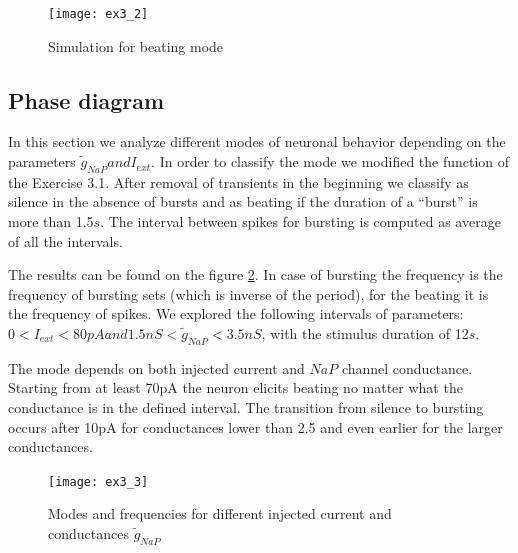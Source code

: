 \documentclass[a4paper,11pt]{article} %
\begin{document}
\begin{figure}[H]
    \centering
    \texttt{[image: ex3\_2]}
    \caption{Simulation for beating mode}
    \label{fig:beat}
\end{figure}


\subsection{Phase diagram}

In this section we analyze different modes of neuronal behavior
depending on the parameters  $\tilde{g}_{NaP} and I_{ext}$.
In order to classify the mode we modified the function of the Exercise 3.1.
After removal of transients in the beginning we classify as silence in
the absence of bursts and as beating if the duration of a ``burst'' is more than 1.5$s$.
The interval between spikes for bursting is computed as average of all the intervals.

The results can be found on the figure \ref{fig:modes}. In case of bursting
the frequency is the frequency of bursting sets (which is inverse of the period),
for the beating it is the frequency of spikes. We explored the following intervals of
parameters: $0 < I_{ext} < 80pA and 1.5nS < \tilde{g}_{NaP} < 3.5nS$, with
the stimulus duration of 12$s$.

The mode depends on both injected current and $NaP$ channel conductance.
Starting from at least 70pA the neuron elicits beating no matter what the conductance is
in the defined interval. The transition from silence to bursting occurs after 10pA
for conductances lower than 2.5 and even earlier for the larger conductances.

\begin{figure}[H]
    \centering
    \texttt{[image: ex3\_3]}
    \caption{Modes and frequencies for different injected current and conductances $\tilde{g}_{NaP}$}
    \label{fig:modes}
\end{figure}
\end{document}
